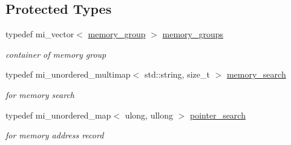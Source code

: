 \subsection*{Protected Types}
\begin{DoxyCompactItemize}
\item 
\mbox{\label{classminerva_1_1foundation_1_1memory__tracker_a5be7a3215edb1bc52e0cbd54b20c51f0}} 
typedef mi\+\_\+vector$<$ \hyperlink{structminerva_1_1foundation_1_1memory__tracker_1_1memory__group}{memory\+\_\+group} $>$ \hyperlink{classminerva_1_1foundation_1_1memory__tracker_a5be7a3215edb1bc52e0cbd54b20c51f0}{memory\+\_\+groups}
\begin{DoxyCompactList}\small\item\em container of memory group \end{DoxyCompactList}\item 
\mbox{\label{classminerva_1_1foundation_1_1memory__tracker_a1540e795038843a4a2d7e965b69aee17}} 
typedef mi\+\_\+unordered\+\_\+multimap$<$ std\+::string, size\+\_\+t $>$ \hyperlink{classminerva_1_1foundation_1_1memory__tracker_a1540e795038843a4a2d7e965b69aee17}{memory\+\_\+search}
\begin{DoxyCompactList}\small\item\em for memory search \end{DoxyCompactList}\item 
typedef mi\+\_\+unordered\+\_\+map$<$ ulong, ullong $>$ \hyperlink{classminerva_1_1foundation_1_1memory__tracker_a1440e17c5c56740dce312e2b49a48199}{pointer\+\_\+search}
\begin{DoxyCompactList}\small\item\em for memory address record \end{DoxyCompactList}\end{DoxyCompactItemize}
